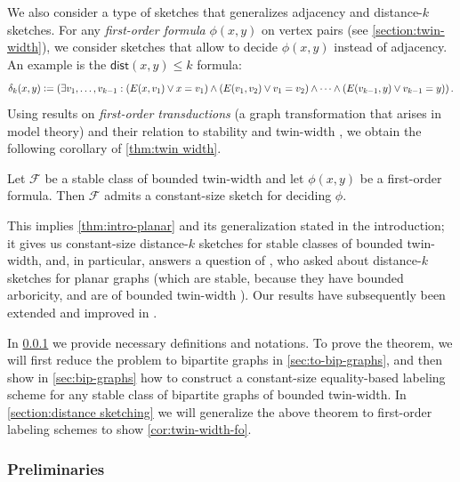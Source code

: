 \documentclass{article}
\makeatletter
\newcommand{\dist}{\mathsf{dist}}
\newcommand{\define}{\vcentcolon=}
\newcommand{\cF}{\ensuremath{\mathcal{F}}}
\newcommand\IfRestateTF{%
  \ifx\label\thmt@gobble@label %
    \expandafter\@firstoftwo
  \else
    \expandafter\@secondoftwo
  \fi
}
\newcommand{\RestateRemark}{\IfRestateTF{{\normalfont\bfseries (Restated) }}{}}
\makeatother
\begin{document}

We also consider a type of sketches that generalizes adjacency and distance-$k$ sketches.  For any
\emph{first-order formula} $\phi(x,y)$ on vertex pairs (see \cref{section:twin-width}), we consider
sketches that allow to decide $\phi(x,y)$ instead of adjacency. An example is the $\dist(x,y) \leq
k$ formula:
\[
  \delta_k(x,y) \define (\exists v_1, \dotsc, v_{k-1} : (E(x,v_1) \vee x=v_1) \wedge
(E(v_1,v_2) \vee v_1=v_2) \wedge
\dotsm \wedge (E(v_{k-1},y) \vee v_{k-1}=y)) \,.
\]
Using results on \emph{first-order transductions} (a graph transformation that arises in model
theory) and their relation to stability and twin-width \cite{BKTW20,NMP+21}, we
obtain the following corollary of \cref{thm:twin width}.

\begin{corollary}
\label{cor:twin-width-fo}
Let $\cF$ be a stable class of bounded twin-width and let $\phi(x,y)$ be a first-order formula.
Then $\cF$ admits a constant-size sketch for deciding $\phi$.
\end{corollary}

This implies
\cref{thm:intro-planar} and its generalization stated in the introduction; it gives us constant-size
distance-$k$ sketches for stable classes of bounded twin-width, and, in particular, answers a
question of \cite{Har20}, who asked about distance-$k$ sketches for planar graphs (which are stable,
because they have bounded arboricity, and are of bounded twin-width \cite{BKTW20}).  Our results
have subsequently been extended and improved in \cite{EHK22}.

In \cref{sec:tw-prelim} we provide necessary definitions and notations.
To prove the theorem, we will first reduce the problem to bipartite graphs in
\cref{sec:to-bip-graphs}, and then show in \cref{sec:bip-graphs} how to construct a constant-size
equality-based labeling scheme for any stable class of bipartite graphs of bounded twin-width.
In \cref{section:distance sketching} we will generalize the above theorem to first-order labeling
schemes to show \cref{cor:twin-width-fo}.


\subsubsection{Preliminaries}\label{sec:tw-prelim}
\end{document}
